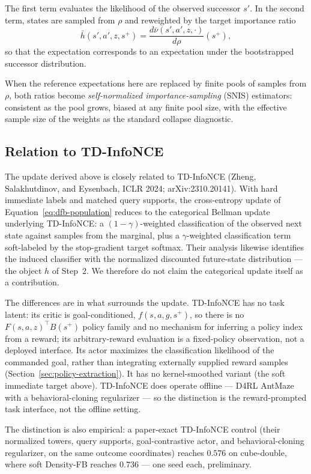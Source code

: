 \documentclass[11pt]{article}
\begin{document}
The first term evaluates the likelihood of the observed successor $s'$.
In the second term, states are sampled from $\rho$ and reweighted by the target importance ratio
\[
\bar h(s',a',z,s^+) = \frac{d\bar\nu(s',a',z,\cdot)}{d\rho}(s^+),
\]
so that the expectation corresponds to an expectation under the bootstrapped successor distribution.

{\color{addgreen}
When the reference expectations here are replaced by finite pools of samples from $\rho$, both ratios become \emph{self-normalized importance-sampling} (SNIS) estimators: consistent as the pool grows, biased at any finite pool size, with the effective sample size of the weights as the standard collapse diagnostic.

\subsection{Relation to TD-InfoNCE}

The update derived above is closely related to TD-InfoNCE (Zheng, Salakhutdinov, and Eysenbach, ICLR 2024; arXiv:2310.20141).
With hard immediate labels and matched query supports, the cross-entropy update of Equation~\eqref{eq:dfb-population} reduces to the categorical Bellman update underlying TD-InfoNCE: a $(1-\gamma)$-weighted classification of the observed next state against samples from the marginal, plus a $\gamma$-weighted classification term soft-labeled by the stop-gradient target softmax.
Their analysis likewise identifies the induced classifier with the normalized discounted future-state distribution --- the object $h$ of Step~2.
We therefore do not claim the categorical update itself as a contribution.

The differences are in what surrounds the update.
TD-InfoNCE has no task latent: its critic is goal-conditioned, $f(s,a,g,s^+)$, so there is no $F(s,a,z)^\top B(s^+)$ policy family and no mechanism for inferring a policy index from a reward; its arbitrary-reward evaluation is a fixed-policy observation, not a deployed interface.
Its actor maximizes the classification likelihood of the commanded goal, rather than integrating externally supplied reward samples (Section~\ref{sec:policy-extraction}).
It has no kernel-smoothed variant (the soft immediate target above).
TD-InfoNCE does operate offline --- D4RL AntMaze with a behavioral-cloning regularizer --- so the distinction is the reward-prompted task interface, not the offline setting.

The distinction is also empirical: a paper-exact TD-InfoNCE control (their normalized towers, query supports, goal-contrastive actor, and behavioral-cloning regularizer, on the same outcome coordinates) reaches $0.576$ on cube-double, where soft Density-FB reaches $0.736$ --- one seed each, preliminary.

}
\end{document}
